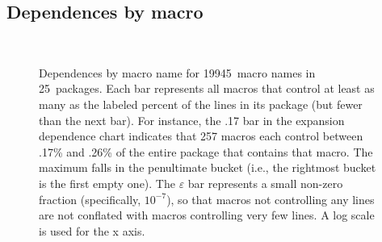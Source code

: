 \documentclass[10pt]{article}
\newcommand{\comment}[1]{\textbf{[[#1]]}}
\def\numdependpackages{25}
\def\numdependmacronames{19945}
\newcommand{\pkg}[1]{\textsf{#1}}
\newcommand{\captionsmall}[1]{\caption[]{\small #1}}
\begin{document}


\subsection{Dependences by macro}

\begin{figure}
\centerline{%
\ %
}
\captionsmall{Dependences by macro name for \numdependmacronames\ macro
  names in \numdependpackages\ packages.  Each bar represents all macros
  that control at least as many as the labeled percent of the lines in its
  package (but fewer than the next bar).  For instance, the .17 bar in the
  expansion dependence chart indicates that 257 macros each control between
  .17\% and .26\% of the entire package that contains that macro.  The
  maximum falls in the penultimate bucket (i.e., the rightmost bucket is
  the first empty one).  The $\varepsilon$ bar represents a small non-zero
  fraction (specifically, $10^{-7}$), so that macros not controlling any lines
  are not conflated with macros controlling very few lines.  A log scale is
  used for the x axis.}

\label{fig:dep-bymacro}
\end{figure}
\end{document}
